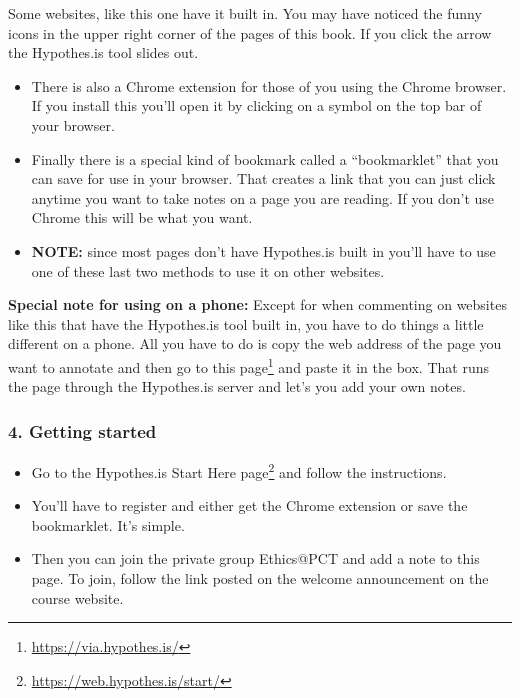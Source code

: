 \documentclass[12pt, openany]{book}
\makeatletter
\renewcommand{\href}[2]{#2\footnote{\url{#1}}}
\newenvironment{kframe}{%
\medskip{}
\setlength{\fboxsep}{.8em}
 \def\at@end@of@kframe{}%
 \ifinner\ifhmode%
  \def\at@end@of@kframe{\end{minipage}}%
  \begin{minipage}{\columnwidth}%
 \fi\fi%
 \def\FrameCommand##1{\hskip\@totalleftmargin \hskip-\fboxsep
 \colorbox{shadecolor}{##1}\hskip-\fboxsep
     \hskip-\linewidth \hskip-\@totalleftmargin \hskip\columnwidth}%
 \MakeFramed {\advance\hsize-\width
   \@totalleftmargin\z@ \linewidth\hsize
   \@setminipage}}%
 {\par\unskip\endMakeFramed%
 \at@end@of@kframe}
\newenvironment{rmdblock}[1]
  {
  \begin{itemize}
  \renewcommand{\labelitemi}{
    \raisebox{-.7\height}[0pt][0pt]{
      {\setkeys{Gin}{width=3em,keepaspectratio}\texttt{[image: img/\#1]}}
    }
  }
  \setlength{\fboxsep}{1em}
  \begin{kframe}
  \item
  }
  {
  \end{kframe}
  \end{itemize}
  }
\newenvironment{note}
  {\begin{rmdblock}{note}}
  {\end{rmdblock}}
\makeatother
\begin{document}
Some websites, like this one have it built in. You may have noticed the funny icons in the upper right corner of the pages of this book. If you click the arrow the Hypothes.is tool slides out.

\begin{itemize}
\item
  There is also a Chrome extension for those of you using the Chrome browser. If you install this you'll open it by clicking on a symbol on the top bar of your browser.
\item
  Finally there is a special kind of bookmark called a ``bookmarklet'' that you can save for use in your browser. That creates a link that you can just click anytime you want to take notes on a page you are reading. If you don't use Chrome this will be what you want.
\item
  \textbf{NOTE:} since most pages don't have Hypothes.is built in you'll have to use one of these last two methods to use it on other websites.
\end{itemize}

\begin{note}

\textbf{Special note for using on a phone:} Except for when commenting on websites like this that have the Hypothes.is tool built in, you have to do things a little different on a phone. All you have to do is copy the web address of the page you want to annotate and then \href{https://via.hypothes.is/}{go to this page} and paste it in the box. That runs the page through the Hypothes.is server and let's you add your own notes.

\end{note}

\hypertarget{getting-started}{%
\subsubsection*{4. Getting started}\label{getting-started}}


\begin{itemize}
\item
  Go to the Hypothes.is \href{https://web.hypothes.is/start/}{Start Here page} and follow the instructions.
\item
  You'll have to register and either get the Chrome extension or save the bookmarklet. It's simple.
\item
  Then you can join the private group Ethics@PCT and add a note to this page. To join, follow the link posted on the welcome announcement on the course website.
\end{itemize}
\end{document}
